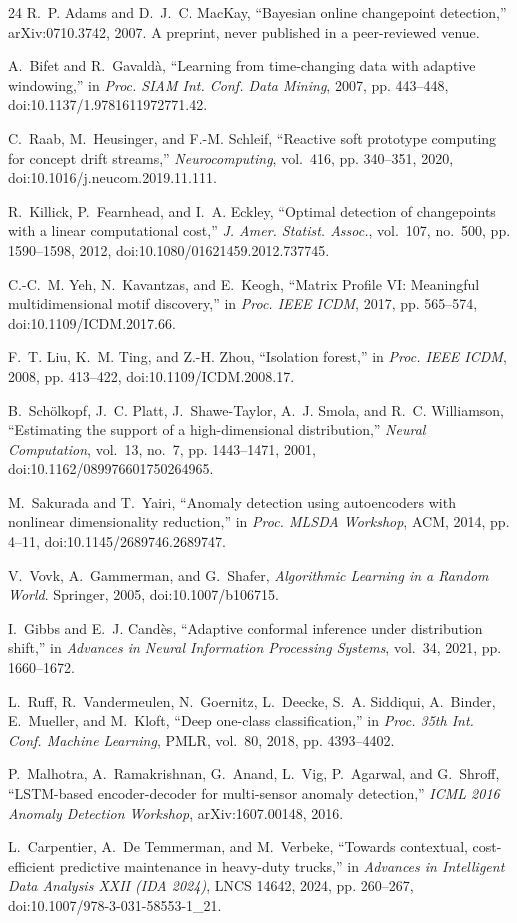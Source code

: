 \documentclass[journal]{IEEEtran}
\begin{document}
\begin{thebibliography}{24}
 R.~P. Adams and D.~J.~C. MacKay, ``Bayesian online changepoint detection,''
arXiv:0710.3742, 2007. A preprint, never published in a peer-reviewed venue.

 A.~Bifet and R.~Gavald\`a, ``Learning from time-changing data with adaptive
windowing,'' in \emph{Proc. SIAM Int. Conf. Data Mining}, 2007, pp. 443--448,
doi:10.1137/1.9781611972771.42.

 C.~Raab, M.~Heusinger, and F.-M. Schleif, ``Reactive soft prototype computing for
concept drift streams,'' \emph{Neurocomputing}, vol.~416, pp. 340--351, 2020,
doi:10.1016/j.neucom.2019.11.111.

 R.~Killick, P.~Fearnhead, and I.~A. Eckley, ``Optimal detection of changepoints
with a linear computational cost,'' \emph{J. Amer. Statist. Assoc.}, vol.~107, no.~500, pp. 1590--1598,
2012, doi:10.1080/01621459.2012.737745.

 C.-C.~M. Yeh, N.~Kavantzas, and E.~Keogh, ``Matrix Profile VI: Meaningful
multidimensional motif discovery,'' in \emph{Proc. IEEE ICDM}, 2017, pp. 565--574,
doi:10.1109/ICDM.2017.66.

 F.~T. Liu, K.~M. Ting, and Z.-H. Zhou, ``Isolation forest,'' in \emph{Proc. IEEE
ICDM}, 2008, pp. 413--422, doi:10.1109/ICDM.2008.17.

 B.~Sch\"olkopf, J.~C. Platt, J.~Shawe-Taylor, A.~J. Smola, and R.~C. Williamson,
``Estimating the support of a high-dimensional distribution,'' \emph{Neural Computation}, vol.~13,
no.~7, pp. 1443--1471, 2001, doi:10.1162/089976601750264965.

 M.~Sakurada and T.~Yairi, ``Anomaly detection using autoencoders with nonlinear
dimensionality reduction,'' in \emph{Proc. MLSDA Workshop}, ACM, 2014, pp. 4--11,
doi:10.1145/2689746.2689747.

 V.~Vovk, A.~Gammerman, and G.~Shafer, \emph{Algorithmic Learning in a Random World}.
Springer, 2005, doi:10.1007/b106715.

 I.~Gibbs and E.~J. Cand\`es, ``Adaptive conformal inference under distribution
shift,'' in \emph{Advances in Neural Information Processing Systems}, vol.~34, 2021, pp. 1660--1672.

 L.~Ruff, R.~Vandermeulen, N.~Goernitz, L.~Deecke, S.~A. Siddiqui, A.~Binder,
E.~Mueller, and M.~Kloft, ``Deep one-class classification,'' in \emph{Proc. 35th Int. Conf. Machine
Learning}, PMLR, vol.~80, 2018, pp. 4393--4402.

 P.~Malhotra, A.~Ramakrishnan, G.~Anand, L.~Vig, P.~Agarwal, and G.~Shroff,
``LSTM-based encoder-decoder for multi-sensor anomaly detection,'' \emph{ICML 2016 Anomaly Detection
Workshop}, arXiv:1607.00148, 2016.

 L.~Carpentier, A.~De Temmerman, and M.~Verbeke, ``Towards contextual,
cost-efficient predictive maintenance in heavy-duty trucks,'' in \emph{Advances in Intelligent Data
Analysis XXII (IDA 2024)}, LNCS 14642, 2024, pp. 260--267, doi:10.1007/978-3-031-58553-1\_21.

\end{thebibliography}
\end{document}
